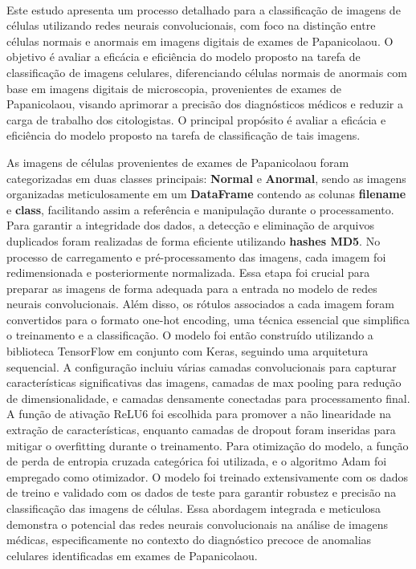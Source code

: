 \\

Este estudo apresenta um processo detalhado para a classificação de imagens de células utilizando redes neurais convolucionais, com foco na distinção entre células normais e anormais em imagens digitais de exames de Papanicolaou. O objetivo é avaliar a eficácia e eficiência do modelo proposto na tarefa de classificação de imagens celulares, diferenciando células normais de anormais com base em imagens digitais de microscopia, provenientes de exames de Papanicolaou, visando aprimorar a precisão dos diagnósticos médicos e reduzir a carga de trabalho dos citologistas. O principal propósito é avaliar a eficácia e eficiência do modelo proposto na tarefa de classificação de tais imagens.

As imagens de células provenientes de exames de Papanicolaou foram categorizadas em duas classes principais: \textbf{Normal} e \textbf{Anormal}, sendo as imagens organizadas meticulosamente em um \textbf{DataFrame} contendo as colunas \textbf{filename} e \textbf{class}, facilitando assim a referência e manipulação durante o processamento. Para garantir a integridade dos dados, a detecção e eliminação de arquivos duplicados foram realizadas de forma eficiente utilizando \textbf{hashes MD5}. No processo de carregamento e pré-processamento das imagens, cada imagem foi redimensionada e posteriormente normalizada. Essa etapa foi crucial para preparar as imagens de forma adequada para a entrada no modelo de redes neurais convolucionais. Além disso, os rótulos associados a cada imagem foram convertidos para o formato one-hot encoding, uma técnica essencial que simplifica o treinamento e a classificação. O modelo foi então construído utilizando a biblioteca TensorFlow em conjunto com Keras, seguindo uma arquitetura sequencial. A configuração incluiu várias camadas convolucionais para capturar características significativas das imagens, camadas de max pooling para redução de dimensionalidade, e camadas densamente conectadas para processamento final. A função de ativação ReLU6 foi escolhida para promover a não linearidade na extração de características, enquanto camadas de dropout foram inseridas para mitigar o overfitting durante o treinamento. Para otimização do modelo, a função de perda de entropia cruzada categórica foi utilizada, e o algoritmo Adam foi empregado como otimizador. O modelo foi treinado extensivamente com os dados de treino e validado com os dados de teste para garantir robustez e precisão na classificação das imagens de células. Essa abordagem integrada e meticulosa demonstra o potencial das redes neurais convolucionais na análise de imagens médicas, especificamente no contexto do diagnóstico precoce de anomalias celulares identificadas em exames de Papanicolaou.